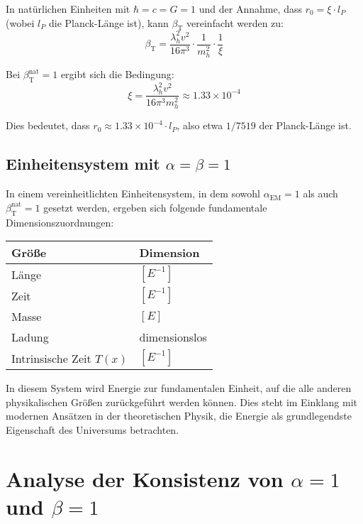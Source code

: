 \documentclass[12pt,a4paper]{article}
\newcommand{\Tfield}{T(x)}
\newcommand{\alphaEM}{\alpha_{\text{EM}}}
\newcommand{\betaT}{\beta_{\text{T}}}
\begin{document}
	In natürlichen Einheiten mit \(\hbar = c = G = 1\) und der Annahme, dass \(r_0 = \xi \cdot l_P\) (wobei \(l_P\) die Planck-Länge ist), kann \(\betaT\) vereinfacht werden zu:
	\begin{equation}
		\betaT = \frac{\lambda_h^2 v^2}{16\pi^3} \cdot \frac{1}{m_h^2} \cdot \frac{1}{\xi}
	\end{equation}
	
	Bei \(\betaT^{\text{nat}} = 1\) ergibt sich die Bedingung:
	\begin{equation}
		\xi = \frac{\lambda_h^2 v^2}{16\pi^3 m_h^2} \approx 1.33 \times 10^{-4}
	\end{equation}
	
	Dies bedeutet, dass \(r_0 \approx 1.33 \times 10^{-4} \cdot l_P\), also etwa \(1/7519\) der Planck-Länge ist.
	
	\subsection{Einheitensystem mit \(\alpha = \beta = 1\)}
	
	In einem vereinheitlichten Einheitensystem, in dem sowohl \(\alphaEM = 1\) als auch \(\betaT^{\text{nat}} = 1\) gesetzt werden, ergeben sich folgende fundamentale Dimensionszuordnungen:
	
	\begin{tcolorbox}[colback=blue!5!white,colframe=blue!75!black,title=Dimensionszuordnungen im vereinheitlichten Einheitensystem]
		\begin{tabular}{ll}
			\textbf{Größe} & \textbf{Dimension} \\
			\hline
			Länge & \([E^{-1}]\) \\
			Zeit & \([E^{-1}]\) \\
			Masse & \([E]\) \\
			Ladung & dimensionslos \\
			Intrinsische Zeit \(\Tfield\) & \([E^{-1}]\) \\
		\end{tabular}
	\end{tcolorbox}
	
	In diesem System wird Energie zur fundamentalen Einheit, auf die alle anderen physikalischen Größen zurückgeführt werden können. Dies steht im Einklang mit modernen Ansätzen in der theoretischen Physik, die Energie als grundlegendste Eigenschaft des Universums betrachten.
	
	\section{Analyse der Konsistenz von \(\alpha = 1\) und \(\beta = 1\)}
	
\end{document}
